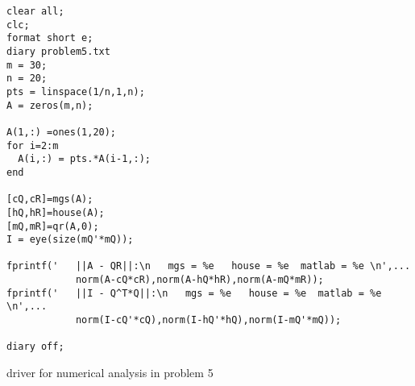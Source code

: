 \documentclass[10pt]{article}
\begin{document}
\begin{program}
\begin{verbatim}
clear all;
clc;
format short e;
diary problem5.txt
m = 30;
n = 20;
pts = linspace(1/n,1,n);
A = zeros(m,n);

A(1,:) =ones(1,20);
for i=2:m
  A(i,:) = pts.*A(i-1,:);
end

[cQ,cR]=mgs(A);
[hQ,hR]=house(A);
[mQ,mR]=qr(A,0);
I = eye(size(mQ'*mQ));

fprintf('   ||A - QR||:\n   mgs = %e   house = %e  matlab = %e \n',...
            norm(A-cQ*cR),norm(A-hQ*hR),norm(A-mQ*mR));
fprintf('   ||I - Q^T*Q||:\n   mgs = %e   house = %e  matlab = %e \n',...
            norm(I-cQ'*cQ),norm(I-hQ'*hQ),norm(I-mQ'*mQ));

diary off;
\end{verbatim}
  \caption{driver for numerical analysis in problem 5}
\end{program}
\end{document}
